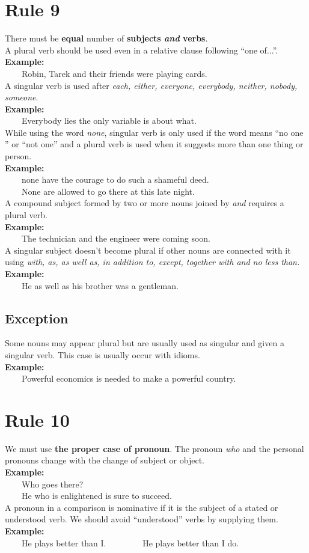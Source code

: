 \documentclass[12pt]{report}
\newcommand{\xmpl}{\textbf{Example:}\\} %
\newcommand{\indnt}{\ \ \ \ } %
\begin{document}
\section{Rule 9}
There must be \textbf{equal} number of \textbf{subjects \emph{and} verbs}.\\ 
A plural verb should be used even in a relative clause following ``one of...''.\\
\xmpl
\indnt Robin, Tarek and their friends were playing cards.\\
A singular verb is used after \emph{each, either, everyone, everybody, neither, nobody, someone}.\\
\xmpl
\indnt Everybody lies the only variable is about what.\\
While using the word \emph{none}, singular verb is only used if the word means ``no one '' or ``not one'' and a plural verb is used when it suggests more than one thing or person.\\
\xmpl
\indnt none have the courage to do such a shameful deed.\\
\indnt None are allowed to go there at this late night.\\
A compound subject formed by two or more nouns joined by \emph{and} requires a plural verb.\\
\xmpl
\indnt The technician and the engineer were coming soon.\\
A singular subject doesn't become plural if other nouns are connected with it using \emph{with, as, as well as, in addition to, except, together with \emph{and} no less than.}\\
\xmpl
\indnt He as well as his brother was a gentleman.\\
\subsection{Exception}
Some nouns may appear plural but are usually used as singular and given a singular verb. This case is usually occur with idioms.\\
\textbf{Example:}\\
\indnt Powerful economics is needed to make a powerful country.


\section{Rule 10}
We must use \textbf{the proper case of pronoun}. The pronoun \textit{who} and the personal pronouns change with the change of subject or object.\\
\xmpl
\indnt Who goes there?\\
\indnt He who is enlightened is sure to succeed.\\
A pronoun in a comparison is nominative if it is the subject of a stated or understood verb. We should avoid ``understood'' verbs by supplying them.
\xmpl
\indnt He plays better than I. \indnt \indnt He plays better than I do.
\end{document}
